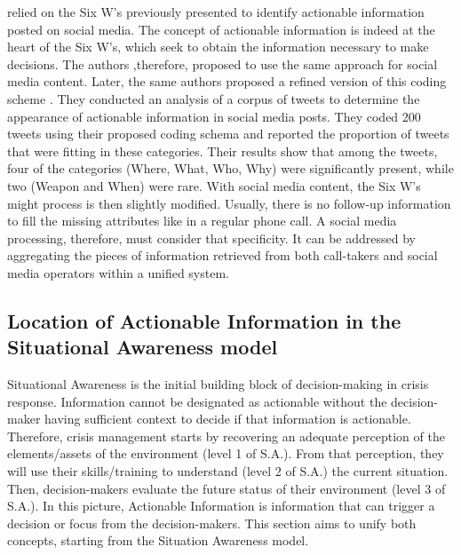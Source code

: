 \textcite{kropczynskiIdentifyingActionableInformation2018} relied on the Six W's previously presented to identify actionable information posted on social media.
The concept of actionable information is indeed at the heart of the Six W's, which seek to obtain the information necessary to make decisions.
The authors ,therefore, proposed to use the same approach for social media content.
Later, the same authors proposed a refined version of this coding scheme \parencite{kropczynskiRefiningCodingScheme2019}.
They conducted an analysis of a corpus of tweets to determine the appearance of actionable information in social media posts.
They coded 200 tweets using their proposed coding schema and reported the proportion of tweets that were fitting in these categories.
Their results show that among the tweets, four of the categories (Where, What, Who, Why) were significantly present, while two (Weapon and When) were rare.
With social media content, the Six W's might process is then slightly modified.
Usually, there is no follow-up information to fill the missing attributes like in a regular phone call.
A social media processing, therefore, must consider that specificity.
It can be addressed by aggregating the pieces of information retrieved from both call-takers and social media operators within a unified system.

\subsection{Location of Actionable Information in the Situational Awareness model}
Situational Awareness is the initial building block of decision-making in crisis response.
Information cannot be designated as actionable without the decision-maker having sufficient context to decide if that information is actionable.
Therefore, crisis management starts by recovering an adequate perception of the elements/assets of the environment (level 1 of S.A.).
From that perception, they will use their skills/training to understand (level 2 of S.A.) the current situation.
Then, decision-makers evaluate the future status of their environment (level 3 of S.A.).
In this picture, Actionable Information is information that can trigger a decision or focus from the decision-makers.
This section aims to unify both concepts, starting from the Situation Awareness model.

